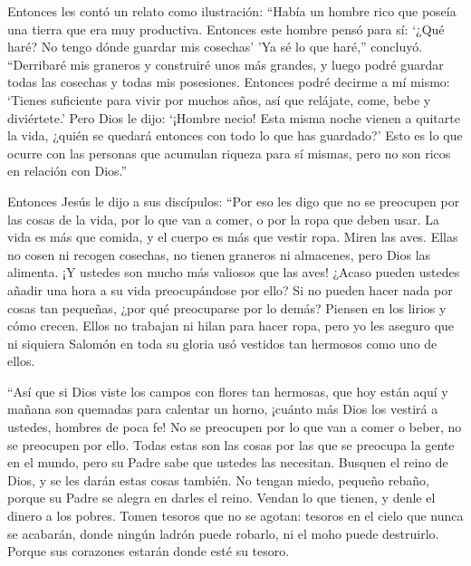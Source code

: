  Entonces les contó un relato como ilustración: ``Había un
hombre rico que poseía una tierra que era muy productiva. 
Entonces este hombre pensó para sí: `¿Qué haré? No tengo dónde guardar
mis cosechas'  'Ya sé lo que haré,'' concluyó. ``Derribaré
mis graneros y construiré unos más grandes, y luego podré guardar todas
las cosechas y todas mis posesiones.  Entonces podré
decirme a mí mismo: `Tienes suficiente para vivir por muchos años, así
que relájate, come, bebe y diviértete.'  Pero Dios le dijo:
`¡Hombre necio! Esta misma noche vienen a quitarte la vida, ¿quién se
quedará entonces con todo lo que has guardado?'  Esto es lo
que ocurre con las personas que acumulan riqueza para sí mismas, pero no
son ricos en relación con Dios.''

 Entonces Jesús le dijo a sus discípulos: ``Por eso les
digo que no se preocupen por las cosas de la vida, por lo que van a
comer, o por la ropa que deben usar.  La vida es más que
comida, y el cuerpo es más que vestir ropa.  Miren las
aves. Ellas no cosen ni recogen cosechas, no tienen graneros ni
almacenes, pero Dios las alimenta. ¡Y ustedes son mucho más valiosos que
las aves!  ¿Acaso pueden ustedes añadir una hora a su vida
preocupándose por ello?  Si no pueden hacer nada por cosas
tan pequeñas, ¿por qué preocuparse por lo demás?  Piensen
en los lirios y cómo crecen. Ellos no trabajan ni hilan para hacer ropa,
pero yo les aseguro que ni siquiera Salomón en toda su gloria usó
vestidos tan hermosos como uno de ellos.

 ``Así que si Dios viste los campos con flores tan
hermosas, que hoy están aquí y mañana son quemadas para calentar un
horno, ¡cuánto más Dios los vestirá a ustedes, hombres de poca fe!
 No se preocupen por lo que van a comer o beber, no se
preocupen por ello.  Todas estas son las cosas por las que
se preocupa la gente en el mundo, pero su Padre sabe que ustedes las
necesitan.  Busquen el reino de Dios, y se les darán estas
cosas también.  No tengan miedo, pequeño rebaño, porque su
Padre se alegra en darles el reino.  Vendan lo que tienen,
y denle el dinero a los pobres. Tomen tesoros que no se agotan: tesoros
en el cielo que nunca se acabarán, donde ningún ladrón puede robarlo, ni
el moho puede destruirlo.  Porque sus corazones estarán
donde esté su tesoro.

